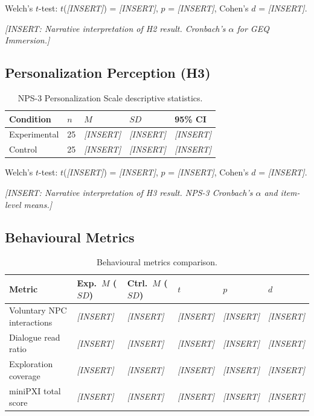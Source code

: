 Welch's $t$-test: $t$(\textit{[INSERT]}) = \textit{[INSERT]}, $p$ = \textit{[INSERT]}, Cohen's $d$ = \textit{[INSERT]}.

\textit{[INSERT: Narrative interpretation of H2 result. Cronbach's $\alpha$ for GEQ Immersion.]}

\subsection{Personalization Perception (H3)}

\begin{table}[H]
\centering
\caption{NPS-3 Personalization Scale descriptive statistics.}
\label{tab:nps3}
\small
\begin{tabular}{@{}lllll@{}}
\toprule
\textbf{Condition} & $n$ & $M$ & $SD$ & \textbf{95\% CI} \\
\midrule
Experimental & 25 & \textit{[INSERT]} & \textit{[INSERT]} & \textit{[INSERT]} \\
Control & 25 & \textit{[INSERT]} & \textit{[INSERT]} & \textit{[INSERT]} \\
\bottomrule
\end{tabular}
\end{table}

Welch's $t$-test: $t$(\textit{[INSERT]}) = \textit{[INSERT]}, $p$ = \textit{[INSERT]}, Cohen's $d$ = \textit{[INSERT]}.

\textit{[INSERT: Narrative interpretation of H3 result. NPS-3 Cronbach's $\alpha$ and item-level means.]}

\subsection{Behavioural Metrics}

\begin{table}[H]
\centering
\caption{Behavioural metrics comparison.}
\label{tab:behavioural}
\small
\begin{tabular}{@{}llllll@{}}
\toprule
\textbf{Metric} & \textbf{Exp.\ $M$ ($SD$)} & \textbf{Ctrl.\ $M$ ($SD$)} & $t$ & $p$ & $d$ \\
\midrule
Voluntary NPC interactions & \textit{[INSERT]} & \textit{[INSERT]} & \textit{[INSERT]} & \textit{[INSERT]} & \textit{[INSERT]} \\
Dialogue read ratio & \textit{[INSERT]} & \textit{[INSERT]} & \textit{[INSERT]} & \textit{[INSERT]} & \textit{[INSERT]} \\
Exploration coverage & \textit{[INSERT]} & \textit{[INSERT]} & \textit{[INSERT]} & \textit{[INSERT]} & \textit{[INSERT]} \\
miniPXI total score & \textit{[INSERT]} & \textit{[INSERT]} & \textit{[INSERT]} & \textit{[INSERT]} & \textit{[INSERT]} \\
\bottomrule
\end{tabular}
\end{table}

